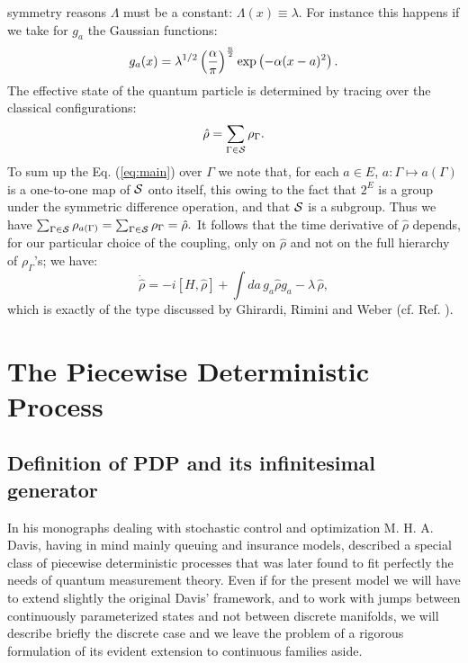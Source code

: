 \documentclass[12pt]{article}
\def\be{\begin{equation}}
\def\ee{\end{equation}}
\begin{document}
symmetry reasons $\Lambda$ must be a constant: $\Lambda(x)\equiv\lambda$.
For instance this happens if we take for $g_a$ the Gaussian functions: \be
g_a(x)=\lambda^{1/2}\left({\alpha\over\pi}\right)^{n\over 2}
\exp\left({-\alpha (x-a)^2}\right). \ee The effective state of the quantum
particle is determined by tracing over the classical configurations: \be
{\hat\rho}=\sum_{\Gamma\in{\cal S}} \rho_\Gamma. \ee To sum up the Eq.
(\ref{eq:main}) over $\Gamma$ we note that, for each $a\in E$,
$a:\Gamma\mapsto a(\Gamma)$ is a one-to-one map of ${\cal S}$ onto
itself, this owing to the fact that $2^E$ is a group under the
symmetric difference operation, and that ${\cal S}$ is a subgroup. Thus
we have $\sum_{\Gamma\in{\cal S}}\rho_{a(\Gamma)}= \sum_{\Gamma\in{\cal
S}}\rho_\Gamma={\hat\rho}.$ It follows that the time derivative of
${\hat\rho}$ depends, for our particular choice of the coupling, only on
${\hat\rho}$ and not on the full hierarchy of $\rho_\Gamma$'s; we have: \be
{\dot {\hat\rho}} = -i[H,{\hat\rho}]+\int da\, g_a{\hat\rho} g_a -\lambda\,
{\hat\rho },\ee which is exactly of the type discussed by Ghirardi, Rimini
and Weber (cf. Ref. \cite{ghi1}).

\section{The Piecewise Deterministic Process}\label{pdp}
\subsection{Definition of  PDP  and its infinitesimal generator}
In his monographs \cite{davmha1,davmha2} dealing with stochastic control
and optimization M. H. A. Davis, having in mind mainly queuing and
insurance models, described a special class of piecewise deterministic
processes that was later found to fit perfectly the needs of quantum
measurement theory. Even if for the present model we will have to extend
slightly the original Davis' framework, and to work with jumps between
continuously parameterized states and not between discrete manifolds, we
will describe briefly the discrete case and we leave the problem of a
rigorous formulation of its evident extension to continuous families
aside.
\end{document}
